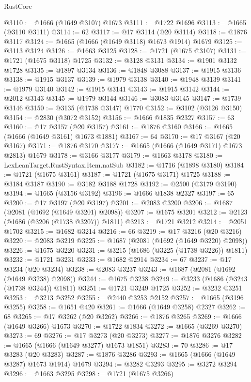 \begin{lexlean}{RustCore}
\begin{coremodule}
@3110 := @1666 (@1649 @3107) @1673
@3111 := @1722 @1696
@3113 := @1665 (@3110 @3111)
@3114 := 62
@3117 := @17 @3114 (@20 @3114)
@3118 := @1876 @3117
@3124 := @1665 (@1666 (@1649 @3118) @1673 @1914) @1679
@3125 := @3113 @3124
@3126 := @1663 @3125
@3128 := @1721 (@1675 @3107)
@3131 := @1721 (@1675 @3118) @1725
@3132 := @3128 @3131
@3134 := @1901 @3132 @1728
@3135 := @1897 @3134
@3136 := @1848 @3088
@3137 := @1915 @3136
@3138 := @1915 @3137
@3139 := @1979 @3138
@3140 := @1948 @3139
@3141 := @1979 @3140
@3142 := @1915 @3141
@3143 := @1915 @3142
@3144 := @2012 @3143
@3145 := @1979 @3144
@3146 := @3083 @3145
@3147 := @1739 @3146
@3150 := @3135 (@1738 @3147) @1770
@3152 := @3102 (@3126 @3150)
@3154 := @2830 (@3072 @3152)
@3156 := @1666 @1835 @2327
@3157 := 63
@3160 := @17 @3157 (@20 @3157)
@3161 := @1876 @3160
@3166 := @1665 (@1666 (@1649 @3161) @1673 @1881)
@3167 := 64
@3170 := @17 @3167 (@20 @3167)
@3171 := @1876 @3170
@3177 := @1665 (@1666 (@1649 @3171) @1673 @2813) @1679
@3178 := @3166 @3177
@3179 := @1663 @3178
@3180 := LexLeanTarget.RustSyntax.Item.natSub
@3182 := @1716 (@1898 @3180)
@3184 := @1721 (@1675 @3161)
@3187 := @1721 (@1675 @3171) @1725
@3188 := @3184 @3187
@3190 := @3182 @3188 @1728
@3192 := @2500 (@3179 @3190)
@3194 := @1665 (@3156 @3192)
@3196 := @1666 @1838 @2327
@3197 := 65
@3200 := @17 @3197 (@20 @3197)
@3201 := @2083 @3200
@3206 := @1687 (@2081 (@1692 (@1649 @3201) @2098))
@3207 := @1675 @3201
@3212 := @2123 (@1686 (@3206 (@1738 @3207)) @1811)
@3213 := @1721 @3212
@3214 := @2051 @1702
@3215 := @1682 @3214
@3216 := 66
@3219 := @17 @3216 (@20 @3216)
@3220 := @2083 @3219
@3225 := @1687 (@2081 (@1692 (@1649 @3220) @2098))
@3226 := @1675 @3220
@3231 := @3215 (@1686 (@3225 (@1738 @3226)) @1811)
@3232 := @1721 @3231
@3233 := @1682 @2914
@3234 := 67
@3237 := @17 @3234 (@20 @3234)
@3238 := @2083 @3237
@3243 := @1687 (@2081 (@1692 (@1649 @3238) @2098))
@3244 := @1675 @3238
@3249 := @3233 (@1686 (@3243 (@1738 @3244)) @1811)
@3251 := @1721 @3249 @1725
@3252 := @3232 @3251
@3253 := @3213 @3252
@3255 := @2440 @3253 @2152
@3257 := @1665 (@3196 @3255)
@3258 := @1651 @420
@3261 := @1666 (@1649 @3258) @2327
@3262 := 68
@3265 := @17 @3262 (@20 @3262)
@3266 := @1876 @3265
@3269 := @1666 (@1649 @3266) @1673
@3270 := @1722 @1834
@3272 := @1665 (@3269 @3270)
@3273 := 69
@3276 := @17 @3273 (@20 @3273)
@3277 := @1876 @3276
@3282 := @1665 (@1666 (@1649 @3277) @1673 @1851)
@3283 := 70
@3286 := @17 @3283 (@20 @3283)
@3287 := @1876 @3286
@3293 := @1665 (@1666 (@1649 @3287) @1673 @1914) @1679
@3294 := @3282 @3293
@3295 := @3272 @3294
@3296 := @1663 @3295
@3298 := @1721 (@1675 @3266)

\end{coremodule}
\end{lexlean}
